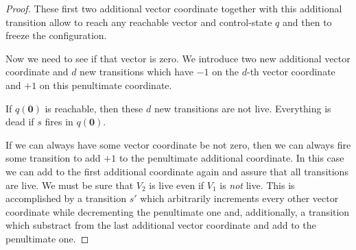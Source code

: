 \begin{proof}
These first two additional vector coordinate together with this additional transition allow
to reach any reachable vector and control-state $q$ and then to freeze the configuration.


Now we need to see if that vector is zero.
We introduce two new additional vector coordinate and $d$ new transitions which have
$-1$ on the $d$-th vector coordinate and $+1$ on this penultimate coordinate. 


If $q(\textbf{0})$ is reachable, then these $d$ new transitions are not live. Everything is dead if $s$ fires in $q(\textbf{0})$.


If we can always have some vector coordinate be not zero, then we can always fire some transition to add $+1$ to the penultimate additional coordinate.
In this case we can add to the first additional coordinate again and assure that all transitions are live.
We must be sure that $V_2$ is live even if $V_1$ is {\em not} live.
This is accomplished by a transition $s'$ which arbitrarily increments every other vector coordinate 
while decrementing the penultimate one and, additionally, a transition which 
substract from the last additional vector coordinate and add to the penultimate one. 



\end{proof}
